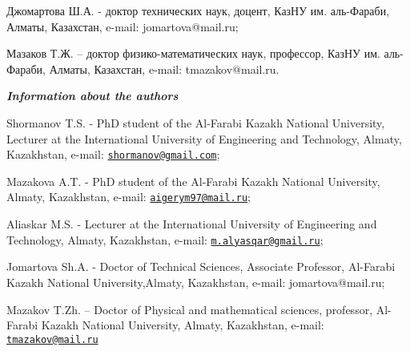 Джомартова Ш.А. - доктор технических наук, доцент, КазНУ им. аль-Фараби,
Алматы, Казахстан, e-mail: jomartova@mail.ru;

Мазаков Т.Ж. -- доктор физико-математических наук, профессор, КазНУ им.
аль-Фараби, Алматы, Казахстан, e-mail: tmazakov@mail.ru.

\emph{{\bfseries Information about the authors}}

Shormanov T.S. - PhD student of the Al-Farabi Kazakh National
University, Lecturer at the International University of Engineering and
Technology, Almaty, Kazakhstan, e-mail:
\href{mailto:shormanov@gmail.com}{\nolinkurl{shormanov@gmail.com}};

Mazakova A.T. - PhD student of the Al-Farabi Kazakh National University,
Almaty, Kazakhstan, e-mail:
\href{mailto:aigerym97@mail.ru}{\nolinkurl{aigerym97@mail.ru}};

Aliaskar M.S. - Lecturer at the International University of Engineering
and Technology, Almaty, Kazakhstan, e-mail:
\href{mailto:m.alyasqar@gmail.ru}{\nolinkurl{m.alyasqar@gmail.ru}};

Jomartova Sh.A. - Doctor of Technical Sciences, Associate Professor,
Al-Farabi Kazakh National University,Almaty, Kazakhstan, e-mail:
jomartova@mail.ru;

Mazakov T.Zh. -- Doctor of Physical and mathematical sciences,
professor, Al-Farabi Kazakh National University, Almaty, Kazakhstan,
e-mail: \href{mailto:tmazakov@mail.ru}{\nolinkurl{tmazakov@mail.ru}}
